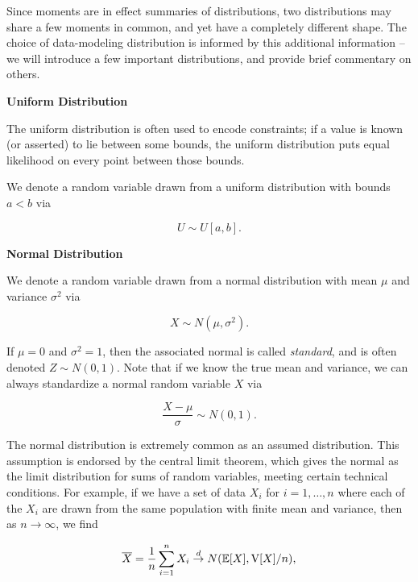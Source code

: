 \documentclass[../primer.tex]{subfiles}
\begin{document}
Since moments are in effect summaries of distributions, two distributions may
share a few moments in common, and yet have a completely different shape. The
choice of data-modeling distribution is informed by this additional information
-- we will introduce a few important distributions, and provide brief commentary
on others.

\noindent\textbf{Uniform Distribution}

The uniform distribution is often used to encode constraints; if a value is
known (or asserted) to lie between some bounds, the uniform distribution puts
equal likelihood on every point between those bounds.

We denote a random variable drawn from a uniform distribution with bounds $a<b$
via

\begin{equation}
  U \sim U[a,b].
\end{equation}

\noindent\textbf{Normal Distribution}

We denote a random variable drawn from a normal distribution with mean $\mu$ and
variance $\sigma^2$ via

\begin{equation}
  X \sim N(\mu, \sigma^2).
\end{equation}

\noindent If $\mu=0$ and $\sigma^2=1$, then the associated normal is called
\emph{standard}, and is often denoted $Z \sim N(0, 1)$. Note that if we know the
true mean and variance, we can always standardize a normal random variable $X$
via

\begin{equation}
  \frac{X - \mu}{\sigma} \sim N(0, 1).
\end{equation}

The normal distribution is extremely common as an assumed distribution. This
assumption is endorsed by the central limit theorem, which gives the normal as
the limit distribution for sums of random variables, meeting certain technical
conditions.\cite{van1998asymptotic} For example, if we have a set of data $X_i$
for $i=1,\dots,n$ where each of the $X_i$ are drawn from the same population
with finite mean and variance, then as $n\to\infty$, we find

\begin{equation} \label{eq:mean-clt}
  \overline{X} = \frac{1}{n}\sum_{i=1}^n X_i \stackrel{d}{\to} N(\mathbb{E}[X], \mathrm{V}[X]/n),
\end{equation}
\end{document}
